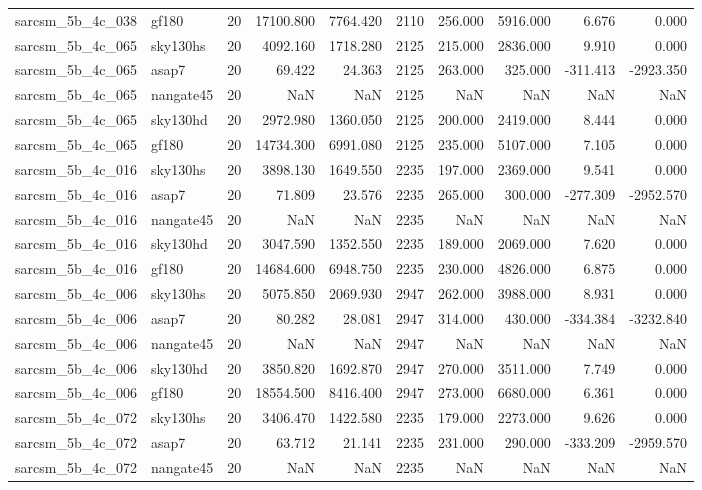 \begin{longtable}{llrrrrrrrr}
sarcsm\_5b\_4c\_038 & gf180 & 20 & 17100.800 & 7764.420 & 2110 & 256.000 & 5916.000 & 6.676 & 0.000 \\
sarcsm\_5b\_4c\_065 & sky130hs & 20 & 4092.160 & 1718.280 & 2125 & 215.000 & 2836.000 & 9.910 & 0.000 \\
sarcsm\_5b\_4c\_065 & asap7 & 20 & 69.422 & 24.363 & 2125 & 263.000 & 325.000 & -311.413 & -2923.350 \\
sarcsm\_5b\_4c\_065 & nangate45 & 20 & NaN & NaN & 2125 & NaN & NaN & NaN & NaN \\
sarcsm\_5b\_4c\_065 & sky130hd & 20 & 2972.980 & 1360.050 & 2125 & 200.000 & 2419.000 & 8.444 & 0.000 \\
sarcsm\_5b\_4c\_065 & gf180 & 20 & 14734.300 & 6991.080 & 2125 & 235.000 & 5107.000 & 7.105 & 0.000 \\
sarcsm\_5b\_4c\_016 & sky130hs & 20 & 3898.130 & 1649.550 & 2235 & 197.000 & 2369.000 & 9.541 & 0.000 \\
sarcsm\_5b\_4c\_016 & asap7 & 20 & 71.809 & 23.576 & 2235 & 265.000 & 300.000 & -277.309 & -2952.570 \\
sarcsm\_5b\_4c\_016 & nangate45 & 20 & NaN & NaN & 2235 & NaN & NaN & NaN & NaN \\
sarcsm\_5b\_4c\_016 & sky130hd & 20 & 3047.590 & 1352.550 & 2235 & 189.000 & 2069.000 & 7.620 & 0.000 \\
sarcsm\_5b\_4c\_016 & gf180 & 20 & 14684.600 & 6948.750 & 2235 & 230.000 & 4826.000 & 6.875 & 0.000 \\
sarcsm\_5b\_4c\_006 & sky130hs & 20 & 5075.850 & 2069.930 & 2947 & 262.000 & 3988.000 & 8.931 & 0.000 \\
sarcsm\_5b\_4c\_006 & asap7 & 20 & 80.282 & 28.081 & 2947 & 314.000 & 430.000 & -334.384 & -3232.840 \\
sarcsm\_5b\_4c\_006 & nangate45 & 20 & NaN & NaN & 2947 & NaN & NaN & NaN & NaN \\
sarcsm\_5b\_4c\_006 & sky130hd & 20 & 3850.820 & 1692.870 & 2947 & 270.000 & 3511.000 & 7.749 & 0.000 \\
sarcsm\_5b\_4c\_006 & gf180 & 20 & 18554.500 & 8416.400 & 2947 & 273.000 & 6680.000 & 6.361 & 0.000 \\
sarcsm\_5b\_4c\_072 & sky130hs & 20 & 3406.470 & 1422.580 & 2235 & 179.000 & 2273.000 & 9.626 & 0.000 \\
sarcsm\_5b\_4c\_072 & asap7 & 20 & 63.712 & 21.141 & 2235 & 231.000 & 290.000 & -333.209 & -2959.570 \\
sarcsm\_5b\_4c\_072 & nangate45 & 20 & NaN & NaN & 2235 & NaN & NaN & NaN & NaN \\

\end{longtable}

